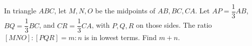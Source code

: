 In triangle $ABC$, let $M,N,O$ be the midpoints of $AB,BC,CA$. Let $AP=\dfrac{1}{3} AB$, $BQ=\dfrac{1}{3} BC$, and $CR=\dfrac{1}{3} CA$, with $P,Q,R$ on those sides. The ratio $[MNO]:[PQR]=m:n$ is in lowest terms. Find $m+n$.
